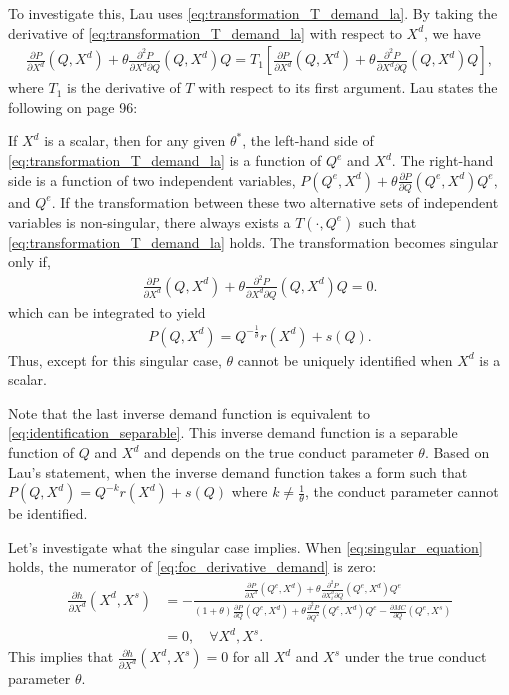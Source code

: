 \documentclass[11pt, a4paper]{article}
\theoremstyle{remark}
\begin{document}
To investigate this, Lau uses \eqref{eq:transformation_T_demand_la}.
By taking the derivative of \eqref{eq:transformation_T_demand_la} with respect to $X^{d}$, we have
\begin{align}
    \frac{\partial P}{\partial X^{d}}(Q, X^{d}) + \theta \frac{\partial^2 P}{\partial X^{d}\partial Q}(Q, X^{d})Q = T_1\left[\frac{\partial P}{\partial X^{d}}(Q, X^{d}) + \theta \frac{\partial^2 P}{\partial X^{d}\partial Q}(Q, X^{d})Q\right], 
\end{align}
where $T_1$ is the derivative of $T$ with respect to its first argument.
Lau states the following on page 96:
\begin{framed}
    If $X^{d}$ is a scalar, then for any given $\theta^*$, the left-hand side of \eqref{eq:transformation_T_demand_la} is a function of $Q^e$ and $X^{d}$.  
    The right-hand side is a function of two independent variables, $P(Q^e, X^{d}) + \theta \frac{\partial P}{\partial Q}(Q^e, X^{d}) Q^e,$ and $Q^e$.  
    If the transformation between these two alternative sets of independent variables is non-singular, there always exists a $T(\cdot, Q^e)$ such that \eqref{eq:transformation_T_demand_la} holds.
    The transformation becomes singular only if,
    \begin{align}
        \frac{\partial P}{\partial X^{d}}(Q, X^{d}) + \theta \frac{\partial^2 P}{\partial X^{d}\partial Q}(Q, X^{d})Q = 0. \label{eq:singular_equation}
    \end{align}
    which can be integrated to yield
    \begin{align}
        P(Q, X^{d}) = Q^{-\frac{1}{\theta}}r(X^{d}) + s(Q).
    \end{align}
    Thus, except for this singular case, $\theta$ cannot be uniquely identified when $X^{d}$ is a scalar.
\end{framed}
Note that the last inverse demand function is equivalent to \eqref{eq:identification_separable}.
This inverse demand function is a separable function of $Q$ and $X^{d}$ and depends on the true conduct parameter $\theta$.
Based on Lau's statement, when the inverse demand function takes a form such that $P(Q, X^{d}) = Q^{-k}r(X^{d}) + s(Q)$ where $k \ne \frac{1}{\theta}$, the conduct parameter cannot be identified.

Let's investigate what the singular case implies.
When \eqref{eq:singular_equation} holds, the numerator of \eqref{eq:foc_derivative_demand} is zero:
\begin{align}
    \frac{\partial h}{\partial X^{d}}(X^{d}, X^{s}) &= -\frac{\frac{\partial P}{\partial X^{d}}(Q^e, X^{d}) + \theta\frac{\partial^2 P}{\partial X^{d}_{i}\partial Q}(Q^e, X^{d})Q^e }{(1+\theta)\frac{\partial P}{\partial Q}(Q^e, X^{d}) + \theta\frac{\partial^2 P}{\partial Q^2}(Q^e, X^{d})Q^e - \frac{\partial MC}{\partial Q}(Q^e, X^{s})} \\
    &= 0, \quad \forall X^{d}, X^{s}.
\end{align}
This implies that  $\frac{\partial h}{\partial X^{d}}(X^{d}, X^{s}) = 0$ for all $X^{d}$ and $X^{s}$ under the true conduct parameter $\theta$.
\end{document}
